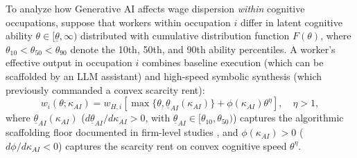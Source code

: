 \documentclass[12pt]{article}
\begin{document}
To analyze how Generative AI affects wage dispersion \textit{within} cognitive occupations, suppose that workers within occupation $i$ differ in latent cognitive ability $\theta \in [\underline{\theta}, \infty)$ distributed with cumulative distribution function $F(\theta)$, where $\theta_{10} < \theta_{50} < \theta_{90}$ denote the 10th, 50th, and 90th ability percentiles. A worker's effective output in occupation $i$ combines baseline execution (which can be scaffolded by an LLM assistant) and high-speed symbolic synthesis (which previously commanded a convex scarcity rent):
\begin{equation}
\label{eq:individual_wage}
w_i(\theta; \kappa_{AI}) = w_{H, i} \left[ \max\{\theta, \underline{\theta}_{AI}(\kappa_{AI})\} + \phi(\kappa_{AI}) \theta^\eta \right], \quad \eta > 1,
\end{equation}
where $\underline{\theta}_{AI}(\kappa_{AI})$ ($d\underline{\theta}_{AI}/d\kappa_{AI} > 0$, with $\underline{\theta}_{AI} \in [\theta_{10}, \theta_{50})$) captures the algorithmic scaffolding floor documented in firm-level studies \citep{brynjolfsson2023, noyes2023}, and $\phi(\kappa_{AI}) > 0$ ($d\phi/d\kappa_{AI} < 0$) captures the scarcity rent on convex cognitive speed $\theta^\eta$.
\end{document}
